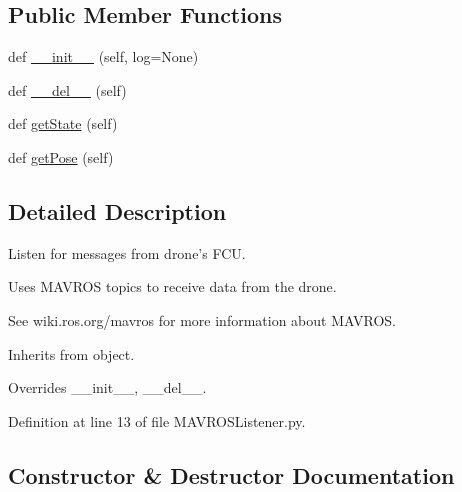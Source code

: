 \subsection*{Public Member Functions}
\begin{DoxyCompactItemize}
\item 
def \mbox{\hyperlink{classwindshape_1_1drone_1_1fcu_1_1_m_a_v_r_o_s_listener_1_1_m_a_v_r_o_s_listener_adc66f66ce7c42fd27f42cb361447ee75}{\+\_\+\+\_\+init\+\_\+\+\_\+}} (self, log=None)
\item 
def \mbox{\hyperlink{classwindshape_1_1drone_1_1fcu_1_1_m_a_v_r_o_s_listener_1_1_m_a_v_r_o_s_listener_a130c4c7a29f2e9c4dc8d56bb7ad5e29b}{\+\_\+\+\_\+del\+\_\+\+\_\+}} (self)
\item 
def \mbox{\hyperlink{classwindshape_1_1drone_1_1fcu_1_1_m_a_v_r_o_s_listener_1_1_m_a_v_r_o_s_listener_a2f38b685fb050dccf2a0eddf244605ca}{get\+State}} (self)
\item 
def \mbox{\hyperlink{classwindshape_1_1drone_1_1fcu_1_1_m_a_v_r_o_s_listener_1_1_m_a_v_r_o_s_listener_a7ded0f686fc683775ed94a7481bacea4}{get\+Pose}} (self)
\end{DoxyCompactItemize}


\subsection{Detailed Description}
\begin{DoxyVerb}Listen for messages from drone's FCU.

Uses MAVROS topics to receive data from the drone.

See wiki.ros.org/mavros for more information about MAVROS.

Inherits from object.

Overrides __init__, __del__.
\end{DoxyVerb}
 

Definition at line 13 of file M\+A\+V\+R\+O\+S\+Listener.\+py.



\subsection{Constructor \& Destructor Documentation}
\mbox{\label{classwindshape_1_1drone_1_1fcu_1_1_m_a_v_r_o_s_listener_1_1_m_a_v_r_o_s_listener_adc66f66ce7c42fd27f42cb361447ee75}} 
